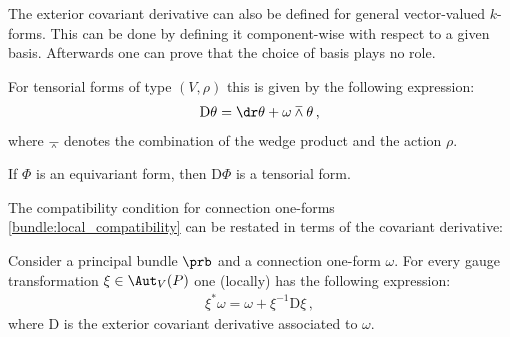     \begin{remark}
        The exterior covariant derivative can also be defined for general vector-valued $k$-forms. This can be done by defining it component-wise with respect to a given basis. Afterwards one can prove that the choice of basis plays no role.

        For tensorial forms of type $(V,\rho)$ this is given by the following expression:
        \begin{gather}
            \label{bundle:derivative_horizontal_form}
            \mathrm{D}\theta = \dr\theta + \omega\barwedge\theta\,,
        \end{gather}
        where $\barwedge$ denotes the combination of the wedge product and the action $\rho$.
    \end{remark}
    \begin{property}[Tensorial]\label{bundle:tensorial_derivative}
        If $\Phi$ is an equivariant form, then $\mathrm{D}\Phi$ is a tensorial form.
    \end{property}

    The compatibility condition for connection one-forms \eqref{bundle:local_compatibility} can be restated in terms of the covariant derivative:
    \begin{property}
        Consider a principal bundle $\prb$ and a connection one-form $\omega$. For every gauge transformation $\xi\in\Aut_V(P)$ one (locally) has the following expression:
        \begin{gather}
            \label{bundle:connection_gauge_transformation}
            \xi^*\omega = \omega + \xi^{-1}\mathrm{D}\xi\,,
        \end{gather}
        where $\mathrm{D}$ is the exterior covariant derivative associated to $\omega$.
    \end{property}

